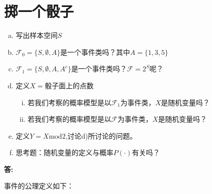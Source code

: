 \documentclass[UTF8]{article}
\begin{document}
\section{掷一个骰子}
\begin{enumerate}[a)]
    \item 写出样本空间$S$
    \item $\mathcal{F}_0=\{S,\emptyset,A\}$是一个事件类吗？其中$A=\{1,3,5\}$
    \item $\mathcal{F}_1=\{S,\emptyset, A, A^c\}$是一个事件类吗？$\mathcal{F}=2^S$呢？
    \item 定义$X=$骰子面上的点数
        \begin{enumerate}[i.]
            \item 若我们考察的概率模型是以$\mathcal{F}_1$为事件类，$X$是随机变量吗？
            \item 若我们考察的概率模型是以$\mathcal{F}$为事件类，$X$是随机变量吗？
        \end{enumerate}
    \item 定义$Y=X\text{mod}2$,讨论d)所讨论的问题。
    \item 思考题：随机变量的定义与概率$P(\cdot)$有关吗？
\end{enumerate}

\textbf{答:}

事件的公理定义如下：
\end{document}

